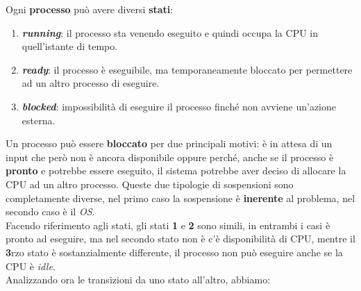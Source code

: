 Ogni \textbf{processo} può avere diversi \textbf{stati}:
\begin{enumerate}[nosep]
    \item \textbf{\textit{running}}: il processo sta venendo eseguito e quindi occupa la CPU in quell'istante di tempo.
    \item \textbf{\textit{ready}}: il processo è eseguibile, ma temporaneamente bloccato per permettere ad un altro processo di eseguire.
    \item \textbf{\textit{blocked}}: impossibilità di eseguire il processo finché non avviene un'azione esterna.
\end{enumerate}
Un processo può essere \textbf{bloccato} per due principali motivi: è in attesa di un input che però non è ancora disponibile oppure perché, anche se il processo è \textbf{pronto} e potrebbe essere eseguito, il sistema potrebbe aver deciso di allocare la CPU ad un altro processo. Queste due tipologie di sospensioni sono completamente diverse, nel primo caso la sospensione è \textbf{inerente} al problema, nel secondo caso è il \textit{OS}. \\
Facendo riferimento agli stati, gli stati \textbf{1} e \textbf{2} sono simili, in entrambi i casi è pronto ad eseguire, ma nel secondo stato non è c'è disponibilità di CPU, mentre il \textbf{3}rzo stato è sostanzialmente differente, il processo non può eseguire anche se la CPU è \textit{idle}. \\
Analizzando ora le transizioni da uno stato all'altro, abbiamo:

